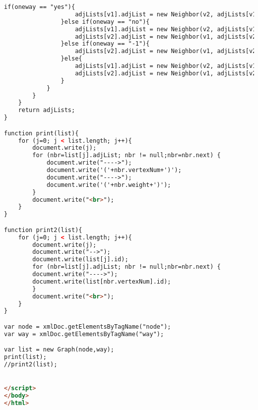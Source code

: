 \begin{lstlisting}[language=HTML,basicstyle=\tiny,caption=list.html]
				if(oneway == "yes"){
					adjLists[v1].adjList = new Neighbor(v2, adjLists[v1].adjList,distance);
				}else if(oneway == "no"){
					adjLists[v1].adjList = new Neighbor(v2, adjLists[v1].adjList,distance);
					adjLists[v2].adjList = new Neighbor(v1, adjLists[v2].adjList,distance);
				}else if(oneway == "-1"){
					adjLists[v2].adjList = new Neighbor(v1, adjLists[v2].adjList,distance);
				}else{
					adjLists[v1].adjList = new Neighbor(v2, adjLists[v1].adjList,distance);
					adjLists[v2].adjList = new Neighbor(v1, adjLists[v2].adjList,distance);
				}	
			}
		}
	}	
	return adjLists;
}

function print(list){
	for (j=0; j < list.length; j++){
		document.write(j);
		for (nbr=list[j].adjList; nbr != null;nbr=nbr.next) {
			document.write("---->");
			document.write('('+nbr.vertexNum+')');
			document.write("---->");
			document.write('('+nbr.weight+')');
		}
		document.write("<br>");
	}
}

function print2(list){
	for (j=0; j < list.length; j++){
		document.write(j);
		document.write("-->");
		document.write(list[j].id);
		for (nbr=list[j].adjList; nbr != null;nbr=nbr.next) {
		document.write("---->");
		document.write(list[nbr.vertexNum].id);
		}
		document.write("<br>");
	}
}

var node = xmlDoc.getElementsByTagName("node");
var way = xmlDoc.getElementsByTagName("way");

var list = new Graph(node,way);
print(list);
//print2(list);


</script>
</body>
</html> 
\end{lstlisting}

